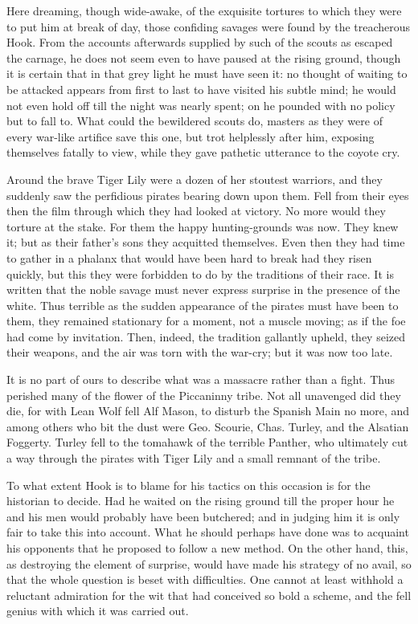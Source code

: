 Here dreaming, though wide-awake, of the exquisite tortures to which
they were to put him at break of day, those confiding savages were
found by the treacherous Hook. From the accounts afterwards supplied by
such of the scouts as escaped the carnage, he does not seem even to
have paused at the rising ground, though it is certain that in that
grey light he must have seen it: no thought of waiting to be attacked
appears from first to last to have visited his subtle mind; he would
not even hold off till the night was nearly spent; on he pounded with
no policy but to fall to. What could the bewildered scouts do, masters
as they were of every war-like artifice save this one, but trot
helplessly after him, exposing themselves fatally to view, while they
gave pathetic utterance to the coyote cry.

Around the brave Tiger Lily were a dozen of her stoutest warriors, and
they suddenly saw the perfidious pirates bearing down upon them. Fell
from their eyes then the film through which they had looked at victory.
No more would they torture at the stake. For them the happy
hunting-grounds was now. They knew it; but as their father's sons they
acquitted themselves. Even then they had time to gather in a phalanx
that would have been hard to break had they risen quickly, but this
they were forbidden to do by the traditions of their race. It is
written that the noble savage must never express surprise in the
presence of the white. Thus terrible as the sudden appearance of the
pirates must have been to them, they remained stationary for a moment,
not a muscle moving; as if the foe had come by invitation. Then,
indeed, the tradition gallantly upheld, they seized their weapons, and
the air was torn with the war-cry; but it was now too late.

It is no part of ours to describe what was a massacre rather than a
fight. Thus perished many of the flower of the Piccaninny tribe. Not
all unavenged did they die, for with Lean Wolf fell Alf Mason, to
disturb the Spanish Main no more, and among others who bit the dust
were Geo. Scourie, Chas. Turley, and the Alsatian Foggerty. Turley fell
to the tomahawk of the terrible Panther, who ultimately cut a way
through the pirates with Tiger Lily and a small remnant of the tribe.

To what extent Hook is to blame for his tactics on this occasion is for
the historian to decide. Had he waited on the rising ground till the
proper hour he and his men would probably have been butchered; and in
judging him it is only fair to take this into account. What he should
perhaps have done was to acquaint his opponents that he proposed to
follow a new method. On the other hand, this, as destroying the element
of surprise, would have made his strategy of no avail, so that the
whole question is beset with difficulties. One cannot at least withhold
a reluctant admiration for the wit that had conceived so bold a scheme,
and the fell genius with which it was carried out.

